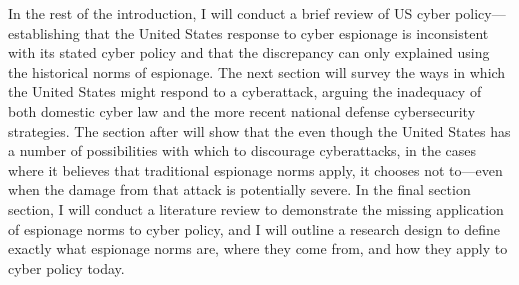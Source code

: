 \documentclass{memoir}
\begin{document}
\begin{refsegment}
In the rest of the introduction, I will conduct a brief review of US cyber policy---establishing that the United States response to cyber espionage is inconsistent with its stated cyber policy and that the discrepancy can only explained using the historical norms of espionage. The next section will survey the ways in which the United States might respond to a cyberattack, arguing the inadequacy of both domestic cyber law and the more recent national defense cybersecurity strategies. The section after will show that the even though the United States has a number of possibilities with which to discourage cyberattacks, in the cases where it believes that traditional espionage norms apply, it chooses not to---even when the damage from that attack is potentially severe. In the final section section, I will conduct a literature review to demonstrate the missing application of espionage norms to cyber policy, and I will outline a research design to define exactly what espionage norms are, where they come from, and how they apply to cyber policy today.







\end{refsegment}
\end{document}
